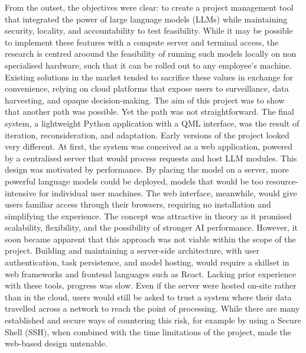 \documentclass{report}
\begin{document}
From the outset, the objectives were clear: to create a project management tool that integrated the power of large language models (LLMs) while maintaining security, locality, and accountability to test feasibility. 
While it may be possible to implement these features with a compute server and terminal access, the research is centred aroound the feasibility of running such models locally on non specialised hardware, such that it can be rolled out to any employee's machine. 
Existing solutions in the market tended to sacrifice these values in exchange for convenience, relying on cloud platforms that expose users to surveillance, data harvesting, and opaque decision-making. 
The aim of this project was to show that another path was possible.
Yet the path was not straightforward. 
The final system, a lightweight Python application with a QML interface, was the result of iteration, reconsideration, and adaptation. 
Early versions of the project looked very different. 
At first, the system was conceived as a web application, powered by a centralised server that would process requests and host LLM modules. 
This design was motivated by performance. 
By placing the model on a server, more powerful language models could be deployed, models that would be too resource-intensive for individual user machines. 
The web interface, meanwhile, would give users familiar access through their browsers, requiring no installation and simplifying the experience.
The concept was attractive in theory as it promised scalability, flexibility, and the possibility of stronger AI performance. 
However, it soon became apparent that this approach was not viable within the scope of the project. 
Building and maintaining a server-side architecture, with user authentication, task persistence, and model hosting, would require a skillset in web frameworks and frontend languages such as React. 
Lacking prior experience with these tools, progress was slow.
Even if the server were hosted on-site rather than in the cloud, users would still be asked to trust a system where their data travelled across a network to reach the point of processing. 
While there are many established and secure ways of countering this risk, for example by using a Secure Shell (SSH), when combined with the time limitations of the project, made the web-based design untenable.



\end{document}
